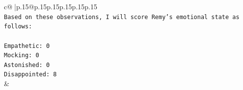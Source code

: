 \documentclass{article}
\begin{document}
{\begin{supertabular}{c@{$\;$}|p{.15\linewidth}@{}p{.15\linewidth}p{.15\linewidth}p{.15\linewidth}p{.15\linewidth}p{.15\linewidth}}
{{{\\ 
\texttt{Based on these observations, I will score Remy's emotional state as follows:} \\
\\ 
\texttt{Empathetic: 0} \\
\texttt{Mocking: 0} \\
\texttt{Astonished: 0} \\
\texttt{Disappointed: 8} \\
            }
        }
    }
    & \\ \\

\end{supertabular}
}
\end{document}
